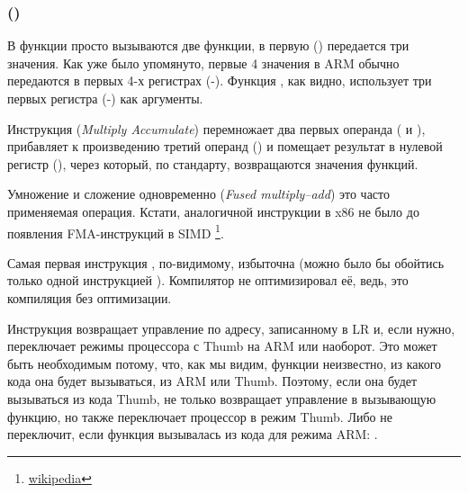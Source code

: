 \subsubsection{\NonOptimizingKeilVI (\ARMMode)}



В функции \main просто вызываются две функции, в первую (\ttf) передается три значения.
Как уже было упомянуто, первые 4 значения в ARM обычно передаются в первых 4-х регистрах (-).
Функция \ttf, как видно, использует три первых регистра (-) как аргументы.

Инструкция  (\emph{Multiply Accumulate}) перемножает два первых операнда ( и ), 
прибавляет к произведению
третий операнд () и помещает результат в нулевой регистр (), через который, по стандарту, 
возвращаются значения функций.

Умножение и сложение одновременно (\emph{Fused multiply–add}) это часто применяемая операция. Кстати, аналогичной
инструкции в x86 не было до появления FMA-инструкций в SIMD
\footnote{\href{http://go.yurichev.com/17103}{wikipedia}}.

Самая первая инструкция , по-видимому, избыточна (можно было бы обойтись только одной инструкцией ).
Компилятор не оптимизировал её, ведь, это компиляция без оптимизации.

Инструкция  возвращает управление по адресу, записанному в \ac{LR} и, если нужно, 
переключает режимы процессора с Thumb на ARM или наоборот.
Это может быть необходимым потому, что, как мы видим, 
функции \ttf неизвестно, из какого кода она будет вызываться, из ARM или Thumb.
Поэтому, если она будет вызываться из кода Thumb,  не только возвращает
управление в вызывающую функцию, но также переключает процессор в режим Thumb.
Либо не переключит, если функция вызывалась из кода для режима ARM: .

